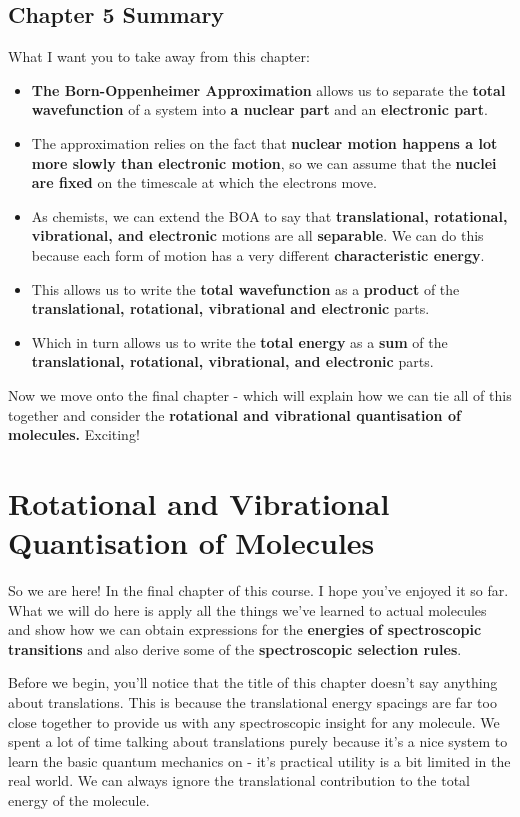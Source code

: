 \documentclass{memoir}[11pt,oneside,a4paper,openany]
\begin{document}
\section{Chapter 5 Summary}
What I want you to take away from this chapter:
\begin{itemize}
	\item \textbf{The Born-Oppenheimer Approximation} allows us to separate the \textbf{total wavefunction} of a system into \textbf{a nuclear part} and an \textbf{electronic part}.
	\item The approximation relies on the fact that \textbf{nuclear motion happens a lot more slowly than electronic motion}, so we can assume that the \textbf{nuclei are fixed} on the timescale at which the electrons move.
	\item As chemists, we can extend the BOA to say that \textbf{translational, rotational, vibrational, and electronic} motions are all \textbf{separable}. We can do this because each form of motion has a very different \textbf{characteristic energy}.
	\item This allows us to write the \textbf{total wavefunction} as a \textbf{product} of the \textbf{translational, rotational, vibrational and electronic} parts.
	\item Which in turn allows us to write the \textbf{total energy} as a \textbf{sum} of the \textbf{translational, rotational, vibrational, and electronic} parts.
\end{itemize}
Now we move onto the final chapter - which will explain how we can tie all of this together and consider the \textbf{rotational and vibrational quantisation of molecules.} Exciting!

\chapter{Rotational and Vibrational Quantisation of Molecules}
So we are here! In the final chapter of this course. I hope you've enjoyed it so far. What we will do here is apply all the things we've learned to actual molecules and show how we can obtain expressions for the \textbf{energies of spectroscopic transitions} and also derive some of the \textbf{spectroscopic selection rules}.

Before we begin, you'll notice that the title of this chapter doesn't say anything about translations. This is because the translational energy spacings are far too close together to provide us with any spectroscopic insight for any molecule. We spent a lot of time talking about translations purely because it's a nice system to learn the basic quantum mechanics on - it's practical utility is a bit limited in the real world. We can always ignore the translational contribution to the total energy of the molecule.
\end{document}
